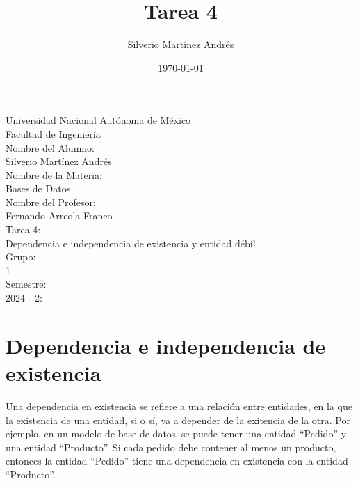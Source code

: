 \documentclass{article}
\begin{document}
	
	\begin{titlepage}
		\centering
		\vspace*{1cm}
		\Large Universidad Nacional Autónoma de México\\
		\Large Facultad de Ingeniería\\
		\vspace*{0.5cm}
		\large Nombre del Alumno:\\
		\large Silverio Martínez Andrés \\
		\vspace*{0.5cm}
		\large Nombre de la Materia:\\
		\large Bases de Datos\\
		\vspace*{0.5cm}
		\large Nombre del Profesor:\\
		\large Fernando Arreola Franco \\
		\vspace*{0.5cm}
		\large Tarea 4:\\
		\large  Dependencia e independencia de existencia y entidad débil\\
		\vspace*{0.5cm}
		\large Grupo:\\
		\large 1 \\
		\vspace*{0.5cm}
		\large Semestre:\\
		\large 2024 - 2:\\
		\vspace*{0.5cm}

	\end{titlepage}
	
	\title{Tarea 4}
	\author{Silverio Martínez Andrés}
	\date{\today}
	
	\maketitle
	
	\section{Dependencia e independencia de existencia}
	Una dependencia en existencia se refiere a una relación entre entidades, en la que la existencia de una entidad, si o sí, va a depender de la exitencia de la otra. Por ejemplo, en un modelo de base de datos, se puede tener una entidad “Pedido” y una entidad “Producto”. Si cada pedido debe contener al menos un producto, entonces la entidad “Pedido” tiene una dependencia en existencia con la entidad “Producto”.
	
\end{document}
